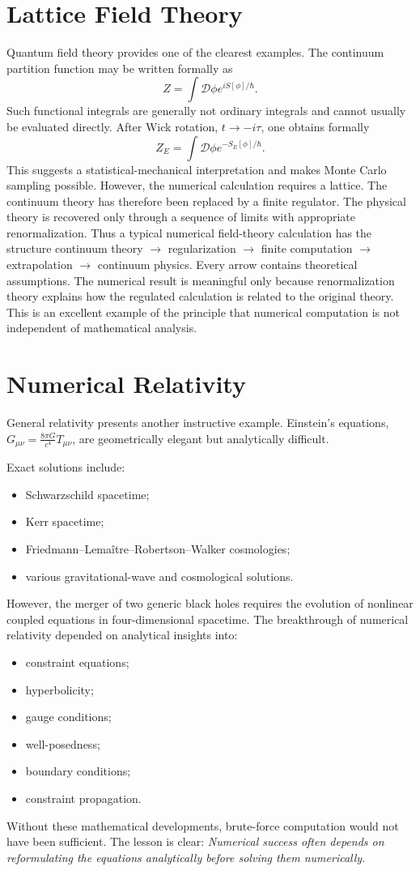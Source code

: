 \section{ Lattice Field Theory}
Quantum field theory provides one of the clearest examples.
The continuum partition function may be written formally as
\[Z=\int\mathcal{D}\phi e^{iS[\phi]/\hbar}.\]
Such functional integrals are generally not ordinary integrals and cannot 
usually be evaluated directly.
After Wick rotation, $t\rightarrow -i\tau$, one obtains formally
\[Z_E=\int\mathcal{D}\phi e^{-S_E[\phi]/\hbar}.\]
This suggests a statistical-mechanical interpretation and makes Monte Carlo sampling possible.
However, the numerical calculation requires a lattice.
The continuum theory has therefore been replaced by a finite regulator.
The physical theory is recovered only through a sequence of limits
with appropriate renormalization.
Thus a typical numerical field-theory calculation has the structure
continuum theory $\rightarrow$ regularization $\rightarrow$
finite computation $\rightarrow$ extrapolation $\rightarrow$ continuum physics.
Every arrow contains theoretical assumptions.
The numerical result is meaningful only because renormalization theory explains
how the regulated calculation is related to the original theory.
This is an excellent example of the principle that numerical computation is not
independent of mathematical analysis.

\section{ Numerical Relativity}
General relativity presents another instructive example.
Einstein's equations,$G_{\mu\nu}=\frac{8\pi G}{c^4}T_{\mu\nu}$,
are geometrically elegant but analytically difficult.

Exact solutions include:
\begin{itemize}
\item Schwarzschild spacetime;
\item Kerr spacetime;
\item Friedmann--Lemaître--Robertson--Walker cosmologies;
\item various gravitational-wave and cosmological solutions.
\end{itemize}
However, the merger of two generic black holes requires the evolution of
nonlinear coupled equations in four-dimensional spacetime.
The breakthrough of numerical relativity depended on analytical insights into:
\begin{itemize}
\item constraint equations;
\item hyperbolicity;
\item gauge conditions;
\item well-posedness;
\item boundary conditions;
\item constraint propagation.
\end{itemize}
Without these mathematical developments, brute-force computation would not have
been sufficient.
The lesson is clear:
\emph{Numerical success often depends on reformulating the equations 
analytically before solving them numerically.}

